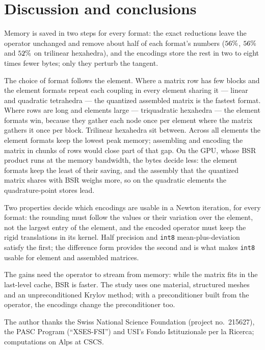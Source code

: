 \documentclass[sigconf,review]{acmart}
\begin{document}
\section{Discussion and conclusions}

Memory is saved in two steps for every format: the exact reductions leave the operator unchanged
and remove about half of each format's numbers ($56\%$, $56\%$ and
$52\%$ on trilinear hexahedra), and the encodings store the rest in two to eight
times fewer bytes; only they perturb the tangent.

The choice of format follows the element.  Where a matrix row has few blocks and the element formats
repeat each coupling in every element sharing it --- linear and quadratic tetrahedra --- the quantized
assembled matrix is the fastest format.  Where rows are long and elements large --- triquadratic
hexahedra --- the element formats win, because they gather each node once per element where the
matrix gathers it once per block.  Trilinear hexahedra sit between.  Across all elements the element
formats keep the lowest peak memory; assembling and encoding the matrix in chunks of rows would
close part of that gap.  On the GPU, whose BSR product runs at the memory bandwidth, the bytes decide
less: the element formats keep the least of their saving, and the assembly that the quantized matrix
shares with BSR weighs more, so on the quadratic elements the quadrature-point stores lead.

Two properties decide which encodings are usable in a Newton iteration, for every format: the
rounding must follow the values or their variation over the element, not the largest entry of the
element, and the encoded operator must keep the rigid translations in its kernel.  Half precision and
\texttt{int8} mean-plus-deviation satisfy the first; the difference form provides the second and is
what makes \texttt{int8} usable for element and assembled matrices.

The gains need the operator to stream from memory: while the matrix fits in the last-level cache,
BSR is faster.  The study uses one material, structured meshes and an unpreconditioned Krylov
method; with a preconditioner built from the operator, the encodings change the preconditioner too.

\begin{acks}
The author thanks the Swiss National Science Foundation (project no.~215627), the PASC Program
(``XSES-FSI'') and USI's Fondo Istituzionale per la Ricerca; computations on Alps at CSCS.
\end{acks}

\FloatBarrier


\end{document}
